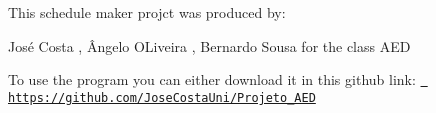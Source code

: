 This schedule maker projct was produced by\+:

José Costa , Ângelo OLiveira , Bernardo Sousa for the class AED

To use the program you can either download it in this github link\+: \href{https://github.com/JoseCostaUni/Projeto_AED}{\texttt{ https\+://github.\+com/\+Jose\+Costa\+Uni/\+Projeto\+\_\+\+AED}} 